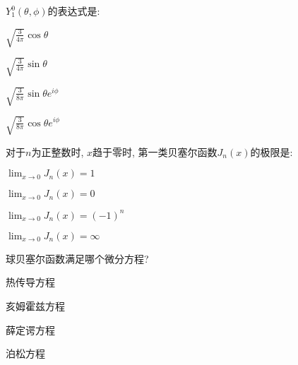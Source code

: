 \documentclass{njustexam}
\begin{document}
\begin{problem}
  $Y_{1}^{0}(\theta,  \phi)$的表达式是:
\begin{abcd}
  \item $\sqrt{\frac{3}{4\pi}} \cos \theta$
  \item $\sqrt{\frac{3}{4\pi}} \sin \theta$
  \item $\sqrt{\frac{3}{8\pi}} \sin \theta e^{i\phi}$
  \item $\sqrt{\frac{3}{8\pi}} \cos \theta e^{i\phi}$
\end{abcd}
\end{problem}



\begin{problem}
  对于$n$为正整数时, $x$趋于零时, 第一类贝塞尔函数$J_n(x)$的极限是:

  \begin{abcd}
\item $\lim_{x \to 0} J_n(x) = 1$

\item $\lim_{x \to 0} J_n(x) = 0$

\item $\lim_{x \to 0} J_n(x) = (-1)^n$

\item $\lim_{x \to 0} J_n(x) = \infty$
 \end{abcd}
\end{problem}


\begin{problem}
  球贝塞尔函数满足哪个微分方程? 

  \begin{abcd}
    \item 热传导方程
    \item 亥姆霍兹方程
    \item 薛定谔方程
    \item 泊松方程
  \end{abcd}
\end{problem}
\end{document}
